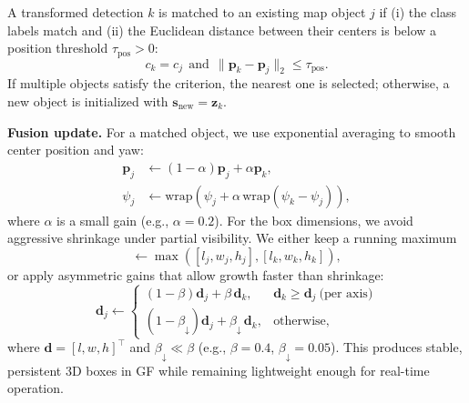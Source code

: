\documentclass[letterpaper, 10 pt, conference]{IEEEtran}  %
\begin{document}
A transformed detection $k$ is matched to an existing map object $j$ if (i) the class labels match and
(ii) the Euclidean distance between their centers is below a position threshold $\tau_{\mathrm{pos}}>0$:
\begin{equation}
c_k=c_j \ \ \text{and}\ \ \|\mathbf{p}_k-\mathbf{p}_j\|_2\le \tau_{\mathrm{pos}}.
\label{eq:assoc}
\end{equation}
If multiple objects satisfy the criterion, the nearest one is selected; otherwise, a new object is initialized with $\mathbf{s}_{\text{new}}=\mathbf{z}_k$.

\textbf{Fusion update.} For a matched object, we use exponential averaging to smooth center position and yaw:
\begin{align}
\mathbf{p}_j &\leftarrow (1-\alpha)\mathbf{p}_j+\alpha \mathbf{p}_k, \label{eq:pos_ema}\\
\psi_j &\leftarrow \mathrm{wrap}\!\left(\psi_j+\alpha\,\mathrm{wrap}(\psi_k-\psi_j)\right),
\label{eq:yaw_ema}
\end{align}
where $\alpha$ is a small gain (e.g., $\alpha=0.2$). For the box dimensions, we avoid aggressive shrinkage under partial visibility. We either keep a running maximum
\begin{equation}
[l_j,w_j,h_j]\leftarrow \max([l_j,w_j,h_j],[l_k,w_k,h_k]),
\label{eq:size_max}
\end{equation}
or apply asymmetric gains that allow growth faster than shrinkage:
\begin{equation}
\mathbf{d}_j \leftarrow
\begin{cases}
(1-\beta)\mathbf{d}_j+\beta\,\mathbf{d}_k, & \mathbf{d}_k \ge \mathbf{d}_j\ \text{(per axis)}\\
(1-\beta_\downarrow)\mathbf{d}_j+\beta_\downarrow\,\mathbf{d}_k, & \text{otherwise},
\end{cases}
\label{eq:size_asym}
\end{equation}
where $\mathbf{d}=[l,w,h]^\top$ and $\beta_\downarrow\ll \beta$ (e.g., $\beta=0.4$, $\beta_\downarrow=0.05$). This produces stable, persistent 3D boxes in GF while remaining lightweight enough for real-time operation.
\end{document}
